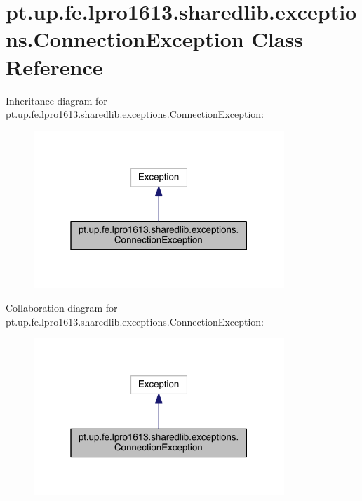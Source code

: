 \hypertarget{classpt_1_1up_1_1fe_1_1lpro1613_1_1sharedlib_1_1exceptions_1_1_connection_exception}{}\section{pt.\+up.\+fe.\+lpro1613.\+sharedlib.\+exceptions.\+Connection\+Exception Class Reference}
\label{classpt_1_1up_1_1fe_1_1lpro1613_1_1sharedlib_1_1exceptions_1_1_connection_exception}


Inheritance diagram for pt.\+up.\+fe.\+lpro1613.\+sharedlib.\+exceptions.\+Connection\+Exception\+:
\nopagebreak
\begin{figure}[H]
\begin{center}
\leavevmode
\includegraphics[width=268pt]{classpt_1_1up_1_1fe_1_1lpro1613_1_1sharedlib_1_1exceptions_1_1_connection_exception__inherit__graph}
\end{center}
\end{figure}


Collaboration diagram for pt.\+up.\+fe.\+lpro1613.\+sharedlib.\+exceptions.\+Connection\+Exception\+:
\nopagebreak
\begin{figure}[H]
\begin{center}
\leavevmode
\includegraphics[width=268pt]{classpt_1_1up_1_1fe_1_1lpro1613_1_1sharedlib_1_1exceptions_1_1_connection_exception__coll__graph}
\end{center}
\end{figure}

